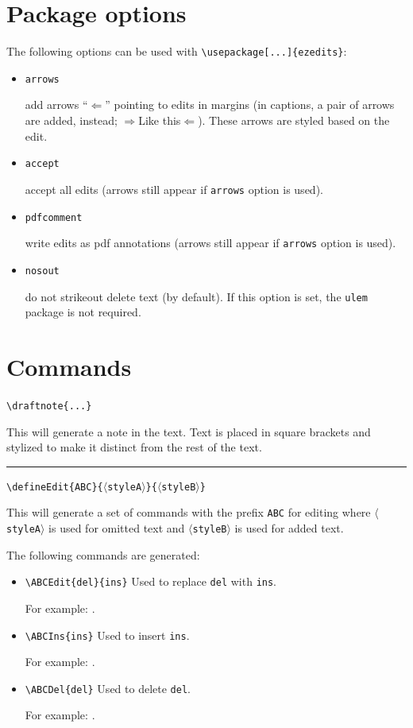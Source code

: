 \documentclass{article}
\begin{document}
\section{Package options}
The following options can be used with \verb+\usepackage[...]{ezedits}+:
\begin{itemize}
    \item \hypertarget{opt_arrows}{\texttt{arrows}} add arrows ``$\Longleftarrow$'' pointing to edits in margins (in captions, a pair of arrows are added, instead; $\Longrightarrow$Like this$\Longleftarrow$). These arrows are styled based on the edit.

    \item \hypertarget{opt_accept}{\texttt{accept}} accept all edits (arrows still appear if \texttt{arrows} option is used).

    \item \hypertarget{opt_pdfcomment}{\texttt{pdfcomment}} write edits as pdf annotations (arrows still appear if \texttt{arrows} option is used).

    \item \hypertarget{opt_nosout}{\texttt{nosout}} do not strikeout delete text (by default). If this option is set, the \texttt{ulem} package is not required.
\end{itemize}


\section{Commands}

\noindent\hypertarget{cmd_draftnote}{\texttt{\textbackslash{draftnote}\{...\}}}

This will generate a note in the text. Text is placed in square brackets and stylized to make it distinct from the rest of the text.


\vspace{5mm}\hrule\vspace{2mm}

\noindent\hypertarget{cmd_defineEdit}{\texttt{\textbackslash{defineEdit}\{ABC\}\{$\langle$styleA$\rangle$\}\{$\langle$styleB$\rangle$\}}}

This will generate a set of commands with the prefix \texttt{ABC} for editing where \texttt{$\langle$styleA$\rangle$} is used for omitted text and \texttt{$\langle$styleB$\rangle$} is used for added text.

The following commands are generated:
\begin{itemize}
    \item \verb+\ABCEdit{del}{ins}+ Used to replace \verb+del+ with \verb+ins+.
    
    For example: .

    \item \verb+\ABCIns{ins}+ Used to insert \verb+ins+.
    
    For example: .

    \item \verb+\ABCDel{del}+ Used to delete \verb+del+.
    
    For example: .
\end{itemize}
\end{document}
